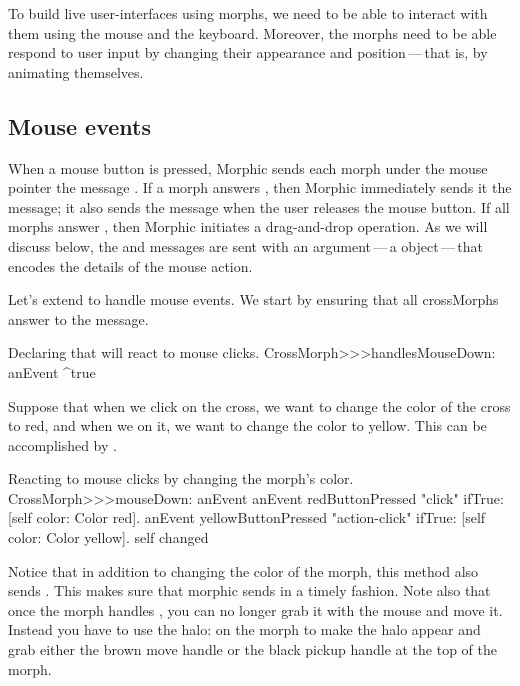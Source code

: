\documentclass[a4paper,10pt,twoside]{book}
\begin{document}
To build live user-interfaces using morphs, we need to be able to interact with them using the mouse and the keyboard.
Moreover, the morphs need to be able respond to user input by changing their appearance and position\,---\,that is, by animating themselves.


\subsection{Mouse events}

When a mouse button is pressed, Morphic sends each morph under the mouse pointer the message . If a morph answers , then Morphic immediately sends it the  message; it also sends the  message when the user releases the mouse button.
If all morphs answer , then Morphic initiates a drag-and-drop operation.
As we will discuss below, the  and  messages are sent with an argument\,---\,a  object\,---\,that encodes the details of the mouse action.

Let's extend  to handle mouse events.  
We start by ensuring that all crossMorphs answer  to the  message. 

\begin{method}{Declaring that  will react to mouse clicks.}
CrossMorph>>>handlesMouseDown: anEvent
	^true
\end{method}

Suppose that when we click on the cross, we want to change the color of the cross to red, and when we \actclick on it, we want to change the color to yellow.
This can be accomplished by .

\begin{method}[mouseDown]{Reacting to mouse clicks by changing the morph's color.}
CrossMorph>>>mouseDown: anEvent
	anEvent redButtonPressed "click"
		ifTrue: [self color: Color red].
	anEvent yellowButtonPressed "action-click"
		ifTrue: [self color: Color yellow].
	self changed
\end{method}

Notice that in addition to changing the color of the morph, this method also sends .
This makes sure that morphic sends  in a timely fashion.
Note also that once the morph handles , you can no longer grab it with the mouse and move it.
Instead you have to use the halo: \metaclick on the morph to make the halo appear and grab either the brown move handle \moveHandle{} or the black pickup handle \grabHandle{} at the top of the morph.
\end{document}
